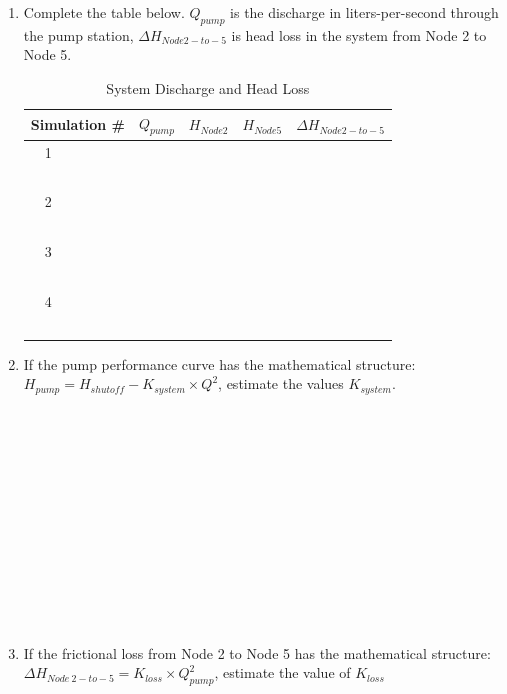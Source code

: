 \documentclass[11pt]{article}
\begin{document}
\begin{enumerate}
\begin{enumerate}
\item Complete the table below.  $Q_{pump}$ is the discharge in liters-per-second through the pump station, $\Delta H_{Node 2 -to- 5}$ is head loss in the system from Node 2 to Node 5.
\begin{table}[htbp]
   \centering
      \caption{System Discharge and Head Loss}
   \begin{tabular}{p{1in} p{1in} p{1in} p{1in} p{1in} } %
Simulation \# & $Q_{pump}$ & $H_{Node2}$ & $H_{Node5}$ & $\Delta H_{Node 2 -to- 5}$ \\
\hline
\hline
~~1 & ~ &~ & ~ & ~ \\
~ & ~ &~ & ~ & ~ \\
\hline
~~2 & ~ &~ & ~ & ~ \\
~ & ~ &~ & ~ & ~ \\
\hline
~~3 & ~ &~ & ~ & ~\\
~ & ~ &~ & ~ & ~ \\
\hline
~~4 & ~ &~ & ~ & ~ \\
~ & ~ &~ & ~ & ~ \\
\hline
   \end{tabular}
   \label{tab:system-curve}
\end{table}



\item If the pump performance curve has the mathematical structure: ~\\
$H_{pump} = H_{shutoff} - K_{system} \times Q^2$, estimate the values $K_{system}$.
\\
\\
\\
\\
\\
\\
\\
\\
\\
\\
\\
\\
\\
\item If the frictional loss from Node 2 to Node 5 has the mathematical structure: ~\\
 $\Delta H_{Node~2 -to- 5}= K_{loss} \times Q_{pump}^2$, estimate the value of $K_{loss}$


\end{enumerate}
\end{enumerate}
\end{document}
